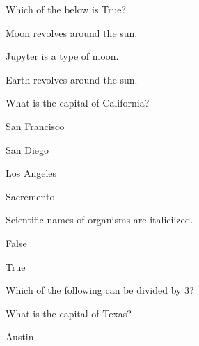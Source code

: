 \documentclass[12pt]{exam}
\begin{document}
\begin{questions}
    \question Which of the below is True?
    
        \begin{oneparchoices}
        
            \choice Moon revolves around the sun.
        
            \choice Jupyter is a type of moon.
        
            \choice Earth revolves around the sun.
        
        \end{oneparchoices}

    \question What is the capital of California?
    
        \begin{oneparchoices}
        
            \choice San Francisco
        
            \choice San Diego
        
            \choice Los Angeles
        
            \choice Sacremento
        
        \end{oneparchoices}

    \question Scientific names of organisms are italiciized.
    
        \begin{oneparchoices}
        
            \choice False
        
            \choice True
        
        \end{oneparchoices}

    \question Which of the following can be divided by 3?
    
        \begin{oneparchoices}
        
        
        
        
        
        \end{oneparchoices}

    \question What is the capital of Texas?
    
        \begin{oneparchoices}
        
            \choice Austin
        

\end{oneparchoices}
\end{questions}
\end{document}
